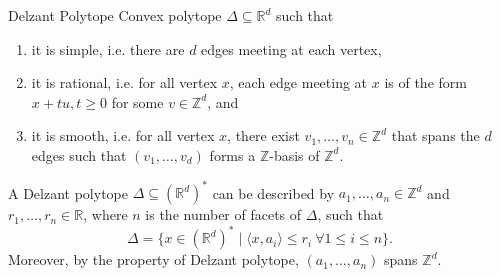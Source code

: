 \documentclass[b5paper,final]{article}
\begin{document}
\begin{definition}{Delzant Polytope}
    Convex polytope $\Delta \subseteq \mathbb{R}^d$ such that
    \begin{enumerate}
        \item it is simple, i.e. there are $d$ edges meeting at each vertex,
        \item it is rational, i.e. for all vertex $x$, each edge meeting at $x$ is of the form $x+tu, t \geq 0$ for some $v \in \mathbb{Z}^d$, and
        \item it is smooth, i.e. for all vertex $x$, there exist $v_1, \dots, v_n \in \mathbb{Z}^d$ that spans the $d$ edges such that $(v_1, \dots, v_d)$ forms a $\mathbb{Z}$-basis of $\mathbb{Z}^d$.
    \end{enumerate}
\end{definition}

\begin{lemma}{}
    A Delzant polytope $\Delta \subseteq (\mathbb{R}^d)^*$ can be described by $a_1, \dots, a_n \in \mathbb{Z}^d$ and $r_1, \dots, r_n \in \mathbb{R}$, where $n$ is the number of facets of $\Delta$, such that
    \begin{equation*}
        \Delta = \{ x \in (\mathbb{R}^d)^* \mid \langle x, a_i \rangle \leq r_i \  \forall 1 \leq i \leq n \}.
    \end{equation*}
    Moreover, by the property of Delzant polytope, $(a_1, \dots, a_n)$ spans $\mathbb{Z}^d$.
\end{lemma}
\end{document}
